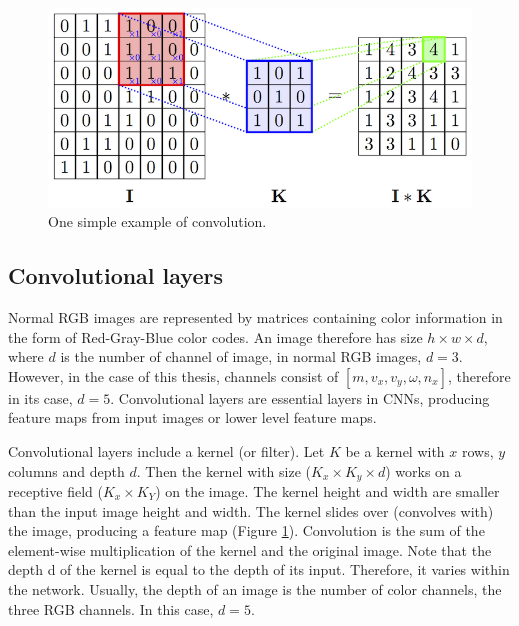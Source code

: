     \begin{figure}[!h]
        \centering
        \includegraphics[scale=1.3]{Figures/convolve.png}
        \caption{One simple example of convolution.}
        \label{con}
    \end{figure}

    \subsection{Convolutional layers}
    Normal RGB images are represented by matrices containing color information in the form of Red-Gray-Blue color codes. An image therefore has size $h\times w \times d$, where $d$ is the number of channel of image, in normal RGB images, $d=3$. However, in the case of this thesis, channels consist of $[m, v_x, v_y, \omega, n_x]$, therefore in its case, $d=5$. Convolutional layers are essential layers in CNNs, producing feature maps from input images or lower level feature maps. 

    Convolutional layers include a kernel (or filter). Let $K$ be a kernel with $x$ rows, $y$ columns and depth $d$. Then the kernel with size ($K_x \times K_y \times d$) works on a receptive field ($K_x \times K_Y$) on the image. The kernel height and width are smaller than the input image height and width. The kernel slides over (convolves with) the image, producing a feature map (Figure \ref{con}). Convolution is the sum of the element-wise multiplication of the kernel and the original image. Note that the depth d of the kernel is equal to the depth of its input. Therefore, it varies within the network. Usually, the depth of an image is the number of color channels, the three RGB channels. In this case, $d=5$. 

